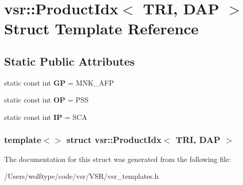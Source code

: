 \hypertarget{structvsr_1_1_product_idx_3_01_t_r_i_00_01_d_a_p_01_4}{\section{vsr\-:\-:Product\-Idx$<$ T\-R\-I, D\-A\-P $>$ Struct Template Reference}
\label{structvsr_1_1_product_idx_3_01_t_r_i_00_01_d_a_p_01_4}
}
\subsection*{Static Public Attributes}
\begin{DoxyCompactItemize}
\item 
\hypertarget{structvsr_1_1_product_idx_3_01_t_r_i_00_01_d_a_p_01_4_a9335d2df79a50206f10af34a8244cc57}{static const int {\bfseries G\-P} = M\-N\-K\-\_\-\-A\-F\-P}\label{structvsr_1_1_product_idx_3_01_t_r_i_00_01_d_a_p_01_4_a9335d2df79a50206f10af34a8244cc57}

\item 
\hypertarget{structvsr_1_1_product_idx_3_01_t_r_i_00_01_d_a_p_01_4_afbc6f5e7309d52f66351f05523cdcdb4}{static const int {\bfseries O\-P} = P\-S\-S}\label{structvsr_1_1_product_idx_3_01_t_r_i_00_01_d_a_p_01_4_afbc6f5e7309d52f66351f05523cdcdb4}

\item 
\hypertarget{structvsr_1_1_product_idx_3_01_t_r_i_00_01_d_a_p_01_4_ae3d6e90fe95cba7124cf7cf3d8771400}{static const int {\bfseries I\-P} = S\-C\-A}\label{structvsr_1_1_product_idx_3_01_t_r_i_00_01_d_a_p_01_4_ae3d6e90fe95cba7124cf7cf3d8771400}

\end{DoxyCompactItemize}
\subsubsection*{template$<$$>$ struct vsr\-::\-Product\-Idx$<$ T\-R\-I, D\-A\-P $>$}



The documentation for this struct was generated from the following file\-:\begin{DoxyCompactItemize}
\item 
/\-Users/wolftype/code/vsr/\-V\-S\-R/vsr\-\_\-templates.\-h\end{DoxyCompactItemize}

